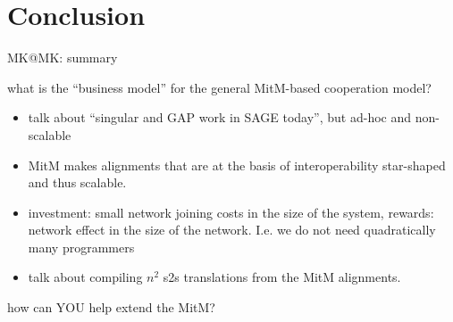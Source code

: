 \section{Conclusion}\label{sec:concl}
\begin{todolist}{MK@MK: summary}
\item what is the ``business model'' for the general MitM-based cooperation model?
  \begin{itemize}
  \item talk about ``singular and GAP work in SAGE today'', but ad-hoc and non-scalable 
  \item MitM makes alignments that are at the basis of interoperability star-shaped and
    thus scalable.
  \item investment: small network joining costs in the size of the system, rewards:
    network effect in the size of the network. I.e. we do not need quadratically many
    programmers
  \item talk about compiling $n^2$ s2s translations from the MitM alignments. 
  \end{itemize}
\item how can YOU help extend the MitM?
\end{todolist}

